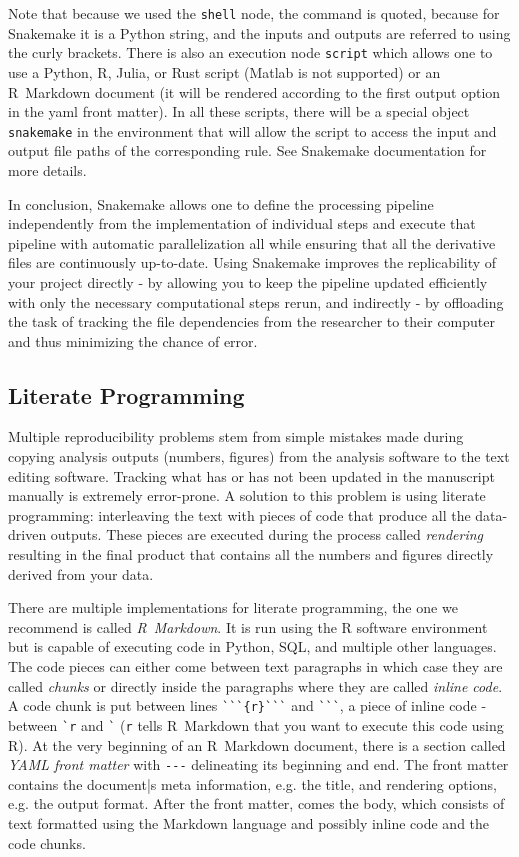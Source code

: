 \documentclass[a4paper,man,floatsintext,natbib]{apa6}
\begin{document}
Note that because we used the \verb|shell| node, the command is quoted, because for Snakemake it is a Python string, and the inputs and outputs are referred to using the curly brackets. There is also an execution node \verb|script| which allows one to use a Python, R, Julia, or Rust script (Matlab is not supported) or an R~Markdown document (it will be rendered according to the first output option in the yaml front matter). In all these scripts, there will be a special object \verb|snakemake| in the environment that will allow the script to access the input and output file paths of the corresponding rule. See Snakemake documentation for more details.

In conclusion, Snakemake allows one to define the processing pipeline independently from the implementation of individual steps and execute that pipeline with automatic parallelization all while ensuring that all the derivative files are continuously up-to-date. Using Snakemake improves the replicability of your project directly - by allowing you to keep the pipeline updated efficiently with only the necessary computational steps rerun, and indirectly - by offloading the task of tracking the file dependencies from the researcher to their computer and thus minimizing the chance of error.

\subsection{Literate Programming}
Multiple reproducibility problems stem from simple mistakes made during copying analysis outputs (numbers, figures) from the analysis software to the text editing software. Tracking what has or has not been updated in the manuscript manually is extremely error-prone. A solution to this problem is using literate programming: interleaving the text with pieces of code that produce all the data-driven outputs. These pieces are executed during the process called \emph{rendering} resulting in the final product that contains all the numbers and figures directly derived from your data.

There are multiple implementations for literate programming, the one we recommend is called \emph{R~Markdown}. It is run using the R software environment but is capable of executing code in Python, SQL, and multiple other languages. The code pieces can either come between text paragraphs in which case they are called \emph{chunks} or directly inside the paragraphs where they are called \emph{inline code}. A code chunk is put between lines \verb|```{r}```| and \verb|```|, a piece of inline code - between \verb|`r| and \verb|`| (\verb|r| tells R~Markdown that you want to execute this code using R). At the very beginning of an R~Markdown document, there is a section called \emph{YAML front matter} with \verb|---| delineating its beginning and end. The front matter contains the document|s meta information, e.g. the title, and rendering options, e.g. the output format. After the front matter, comes the body, which consists of text formatted using the Markdown language and possibly inline code and the code chunks.
\end{document}
